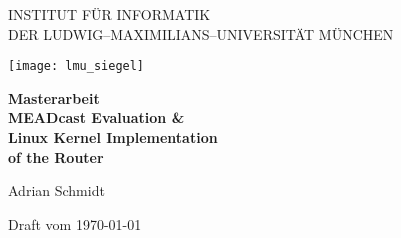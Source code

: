 
\thispagestyle{empty}

\begin{center}

\vspace*{-2cm}

{\Huge INSTITUT FÜR INFORMATIK\\[1mm]}
DER LUDWIG--MAXIMILIANS--UNIVERSITÄT MÜNCHEN\\

\vspace*{1cm}

\texttt{[image: lmu\_siegel]}

\vspace*{2cm}

{\Large \textbf{Masterarbeit}}\\ %

\vspace{2.0cm}
{\Huge \textbf{MEADcast Evaluation \& }}\\
\vspace*{3mm}
{\Huge \textbf{Linux Kernel Implementation}}\\
\vspace*{3mm}
{\Huge \textbf{of the Router}}\\
\vspace{1.5cm}

{\LARGE Adrian Schmidt} %

\vspace{3cm}
Draft vom \today %

\end{center}

\newpage


\thispagestyle{empty}
\cleardoublepage


\thispagestyle{empty}

